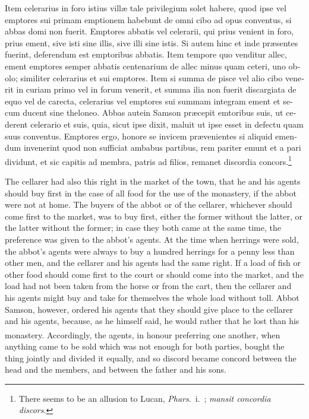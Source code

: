 \documentclass{book}
\newcounter{engnote}
\newcommand{\engnotenum}{\textsuperscript{\arabic{engnote}\stepcounter{engnote}}}
\newcommand{\engnotetext}[1]{\vphantom{\footnotemark{}}\footnotetext{#1}}
\begin{document}
\begin{paracol}{2}
\begin{otherlanguage}{latin}
Item celerarius in foro istius vill\ae{} tale privilegium solet habere, quod ipse vel emptores sui primam emptionem habebunt de omni cibo ad opus conventus, si abbas domi non fuerit. Emptores abbatis vel celerarii, qui prius venient in foro, prius ement, sive isti sine illis, sive illi sine istis. Si autem hinc et inde pr\ae{}sentes fuerint, deferendum est emptoribus abbatis. Item tempore quo venditur allec, ement emptores semper abbatis centenarium de allec minus quam ceteri, uno obolo; similiter celerarius et sui emptores. Item si summa de pisce vel alio cibo venerit in curiam primo vel in forum venerit, et summa ilia non fuerit discargiata de equo vel de carecta, celerarius vel emptores sui summam integram ement et secum ducent sine theloneo. Abbas autein Samson pr\ae{}cepit emtoribus suis, ut cederent celerario et suis, quia, sicut ipse dixit, maluit ut ipse esset in defectu quam suus conventus. Emptores ergo, honore se invicem pr\ae{}venientes\engnotetext{Rom.\ xii., \oldstylenums{10}.} si aliquid emendum invenerint quod non sufficiat ambabus partibus, rem pariter emunt et a pari dividunt, et sic capitis ad membra, patris ad filios, remanet discordia concors.\footnote[\textdagger]{There seems to be an allusion to Lucan, \emph{Phars}.\ i.\ ; \emph{mansit concordia discors}.}
\end{otherlanguage}

\switchcolumn

The cellarer had also this right in the market of the town, that he and his agents should buy first in the case of all food for the use of the monastery, if the abbot were not at home. The buyers of the abbot or of the cellarer, whichever should come first to the market, was to buy first, either the former without the latter, or the latter without the former; in case they both came at the same time, the preference was given to the abbot's agents. At the time when herrings were sold, the abbot's agents were always to buy a hundred herrings for a penny less than other men, and the cellarer and his agents had the same right. If a load of fish or other food should come first to the court or should come into the market, and the load had not been taken from the horse or from the cart, then the cellarer and his agents might buy and take for themselves the whole load without toll. Abbot Samson, however, ordered his agents that they should give place to the cellarer and his agents, because, as he himself said, he would rather that he lost than his monastery. Accordingly, the agents, in honour preferring one another,\engnotenum{} when anything came to be sold which was not enough for both parties, bought the thing jointly and divided it equally, and so discord became concord between the head and the members, and between the father and his sons.


\end{paracol}
\end{document}
